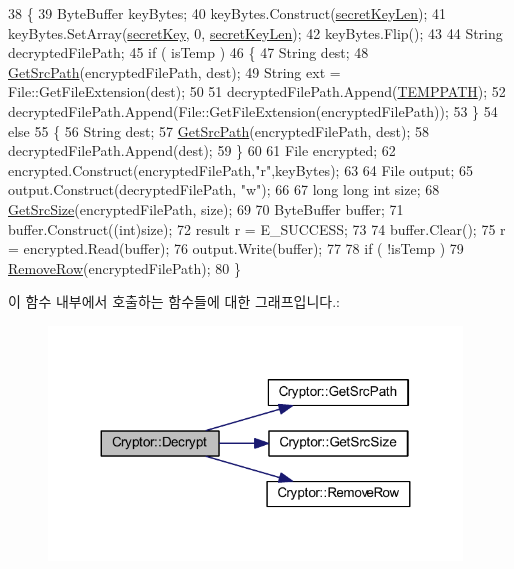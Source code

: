 \begin{DoxyCode}
38 \{
39     ByteBuffer keyBytes;
40     keyBytes.Construct(\hyperlink{_cryptor_8h_a830f141f456d8e1938b97999d31f567c}{secretKeyLen});
41     keyBytes.SetArray(\hyperlink{_cryptor_8h_ae7bd5081d00f228f6cdb6eccc9384839}{secretKey}, 0, \hyperlink{_cryptor_8h_a830f141f456d8e1938b97999d31f567c}{secretKeyLen});
42     keyBytes.Flip();
43 
44     String decryptedFilePath;
45     \textcolor{keywordflow}{if} ( isTemp )
46     \{
47         String dest;
48         \hyperlink{class_cryptor_ad99a9eff2c639cfbbf40fc49817f2ba4}{GetSrcPath}(encryptedFilePath, dest);
49         String ext = File::GetFileExtension(dest);
50 
51         decryptedFilePath.Append(\hyperlink{_folder_browser_8h_a536f167c46920a02a921ed149b74ddfc}{TEMPPATH});
52         decryptedFilePath.Append(File::GetFileExtension(encryptedFilePath));
53     \}
54     \textcolor{keywordflow}{else}
55     \{
56         String dest;
57         \hyperlink{class_cryptor_ad99a9eff2c639cfbbf40fc49817f2ba4}{GetSrcPath}(encryptedFilePath, dest);
58         decryptedFilePath.Append(dest);
59     \}
60 
61     File encrypted;
62     encrypted.Construct(encryptedFilePath,\textcolor{stringliteral}{"r"},keyBytes);
63 
64     File output;
65     output.Construct(decryptedFilePath, \textcolor{stringliteral}{"w"});
66 
67     \textcolor{keywordtype}{long} \textcolor{keywordtype}{long} \textcolor{keywordtype}{int} size;
68     \hyperlink{class_cryptor_a96e75f3328715ed0b303887db77c3e0a}{GetSrcSize}(encryptedFilePath, size);
69 
70     ByteBuffer buffer;
71     buffer.Construct((\textcolor{keywordtype}{int})size);
72     result r = E\_SUCCESS;
73 
74     buffer.Clear();
75     r = encrypted.Read(buffer);
76     output.Write(buffer);
77 
78     \textcolor{keywordflow}{if} ( !isTemp )
79         \hyperlink{class_cryptor_ae50f83111c55db7ea7b2052854bb6bb5}{RemoveRow}(encryptedFilePath);
80 \}
\end{DoxyCode}


이 함수 내부에서 호출하는 함수들에 대한 그래프입니다.\+:
\nopagebreak
\begin{figure}[H]
\begin{center}
\leavevmode
\includegraphics[width=311pt]{class_cryptor_a82e76152a3351f63ae517664187d5498_cgraph}
\end{center}
\end{figure}




